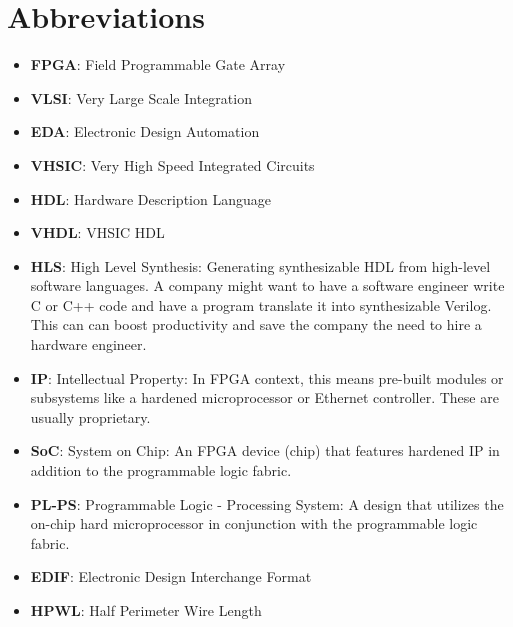\documentclass{article}
\begin{document}
\section{Abbreviations}
    \begin{itemize}[label={--}, left=0.25cm]
        \item \textbf{FPGA}: Field Programmable Gate Array
        \item \textbf{VLSI}: Very Large Scale Integration
        \item \textbf{EDA}: Electronic Design Automation
        \item \textbf{VHSIC}: Very High Speed Integrated Circuits
        \item \textbf{HDL}: Hardware Description Language
        \item \textbf{VHDL}: VHSIC HDL
        \item \textbf{HLS}: High Level Synthesis: Generating synthesizable HDL from high-level software languages. A company might want to have a software engineer write C or C++ code and have a program translate it into synthesizable Verilog. This can can boost productivity and save the company the need to hire a hardware engineer.
        \item \textbf{IP}: Intellectual Property: In FPGA context, this means pre-built modules or subsystems like a hardened microprocessor or Ethernet controller. These are usually proprietary.
        \item \textbf{SoC}: System on Chip: An FPGA device (chip) that features hardened IP in addition to the programmable logic fabric.
        \item \textbf{PL-PS}: Programmable Logic - Processing System: A design that utilizes the on-chip hard microprocessor in conjunction with the programmable logic fabric.
        \item \textbf{EDIF}: Electronic Design Interchange Format
        \item \textbf{HPWL}: Half Perimeter Wire Length
    \end{itemize}
\end{document}
